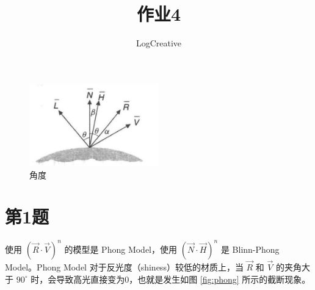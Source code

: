 \documentclass[math-font=newcm]{sjtuarticle}
\title{作业4}
\author{LogCreative}
\begin{document}
\maketitle

\tableofcontents*

\begin{figure}[h]
    \centering
    \includegraphics[width=0.5\textwidth]{angles.jpg}
    \caption{角度}
    \label{fig:angles}    
\end{figure}

\section{第1题}

使用 $(\overrightarrow{R}\cdot\overrightarrow{V})^n$ 的模型是 Phong Model，使用 $(\overrightarrow{N}\cdot\overrightarrow{H})^n$ 是 Blinn-Phong Model。Phong Model 对于反光度（shiness）较低的材质上，当 $\overrightarrow{R}$ 和 $\overrightarrow{V}$ 的夹角大于 $90^\circ$ 时，会导致高光直接变为0，也就是发生如图 \ref{fig:phong} 所示的截断现象。
\end{document}
